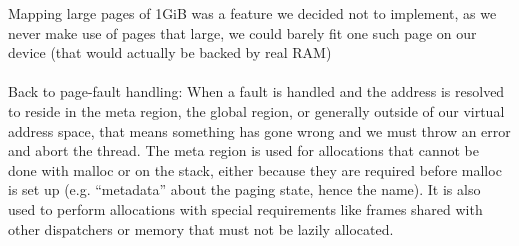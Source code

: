 Mapping large pages of 1GiB was a feature we decided not to implement, as we never make use of
pages that large, we could barely fit one such page on our device (that would actually be backed
by real RAM)







\paragraph{}
Back to page-fault handling: When a fault is handled and the address is resolved to reside in the meta region, the global region, or generally outside of our virtual address space, that means something has gone wrong and we must throw an error and abort the thread.  %
The meta region is used for allocations that cannot be done with malloc or on the stack, either because
they are required before malloc is set up (e.g. ``metadata'' about the paging state, hence the name).
It is also used to perform allocations with special requirements like frames shared with other dispatchers
or memory that must not be lazily allocated.




    
    













